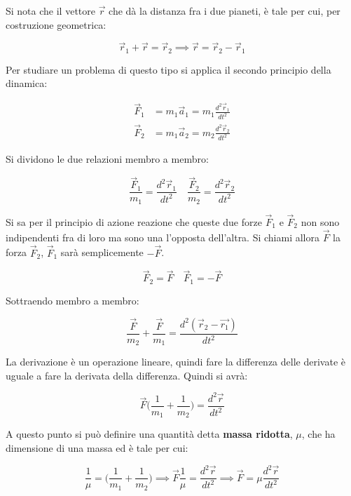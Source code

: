 \begin{figure}[htpb]
\end{figure}
\FloatBarrier
Si nota che il vettore $\vec{r}$ che dà la distanza fra i due pianeti, è tale per cui, per costruzione geometrica:

\[
	\vec{r}_1+\vec{r}=\vec{r}_2 \implies \vec{r}=\vec{r}_2-\vec{r}_1
\]

Per studiare un problema di questo tipo si applica il secondo principio della dinamica:

\begin{align*}
	\vec{F}_1 &= m_1\vec{a}_1=m_1\frac{d^2\vec{r}_1}{dt^2} \\
	\vec{F}_2 &= m_1\vec{a}_2=m_2\frac{d^2\vec{r}_2}{dt^2}
\end{align*}

Si dividono le due relazioni membro a membro:

\[
	\frac{\vec{F}_1}{m_1}=\frac{d^2\vec{r}_1}{dt^2} \quad \frac{\vec{F}_2}{m_2}=\frac{d^2\vec{r}_2}{dt^2}
\]

Si sa per il principio di azione reazione che queste due forze $\vec{F}_1$ e $\vec{F}_2$ non sono indipendenti fra di loro ma sono una l'opposta dell'altra. Si chiami allora $\vec{F}$ la forza $\vec{F}_2$, $\vec{F}_1$ sarà semplicemente $-\vec{F}$.

\[
	\vec{F}_2=\vec{F} \quad \vec{F}_1=-\vec{F}
\]

Sottraendo membro a membro:

\[
	\frac{\vec{F}}{m_2}+\frac{\vec{F}}{m_1}=\frac{d^2(\vec{r}_2-\vec{r_1})}{dt^2}
\]

La derivazione è un operazione lineare, quindi fare la differenza delle derivate è uguale a fare la derivata della differenza. Quindi si avrà:

\[
	\vec{F} \biggl(\frac{1}{m_1}+\frac{1}{m_2} \biggr)=\frac{d^2\vec{r}}{dt^2}
\]

A questo punto si può definire una quantità detta \textbf{massa ridotta}, $\mu$, che ha dimensione di una massa ed è tale per cui:

\[
	\frac{1}{\mu}=\biggl(\frac{1}{m_1}+\frac{1}{m_2} \biggr) \implies \vec{F}\frac{1}{\mu}=\frac{d^2\vec{r}}{dt^2} \implies \vec{F}=\mu \frac{d^2\vec{r}}{dt^2}
\]

